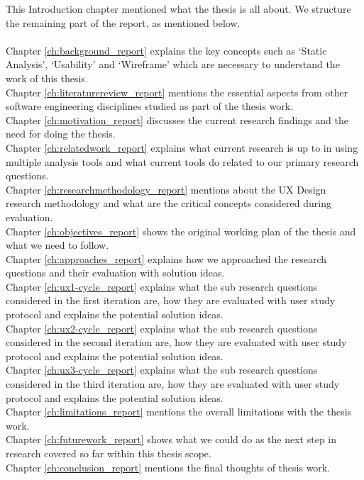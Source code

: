 This Introduction chapter mentioned what the thesis is all about. We structure the remaining part of the report, as mentioned below. \\ \\

\noindent Chapter \ref{ch:background_report} explains the key concepts such as ‘Static Analysis’, ‘Usability’ and ‘Wireframe’ which are necessary to understand the work of this thesis. \\
Chapter \ref{ch:literaturereview_report} mentions the essential aspects from other software engineering disciplines studied as part of the thesis work. \\
Chapter \ref{ch:motivation_report} discusses the current research findings and the need for doing the thesis. \\
Chapter \ref{ch:relatedwork_report} explains what current research is up to in using multiple analysis tools and what current tools do related to our primary research questions. \\
Chapter \ref{ch:researchmethodology_report} mentions about the UX Design research methodology and what are the critical concepts considered during evaluation. \\
Chapter \ref{ch:objectives_report} shows the original working plan of the thesis and what we need to follow. \\
Chapter \ref{ch:approaches_report} explains how we approached the research questions and their evaluation with solution ideas. \\
Chapter \ref{ch:ux1-cycle_report} explains what the sub research questions considered in the first iteration are, how they are evaluated with user study protocol and explains the potential solution ideas. \\
Chapter \ref{ch:ux2-cycle_report} explains what the sub research questions considered in the second iteration are, how they are evaluated with user study protocol and explains the potential solution ideas. \\
Chapter \ref{ch:ux3-cycle_report} explains what the sub research questions considered in the third iteration are, how they are evaluated with user study protocol and explains the potential solution ideas. \\
Chapter \ref{ch:limitations_report} mentions the overall limitations with the thesis work. \\
Chapter \ref{ch:futurework_report} shows what we could do as the next step in research covered so far within this thesis scope. \\
Chapter \ref{ch:conclusion_report} mentions the final thoughts of thesis work. \\ \\

\let\cleardoublepage\clearpage
